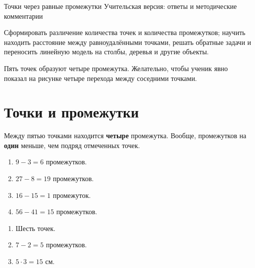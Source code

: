 
\worksheettitle
  {Точки через равные промежутки}
  {Учительская версия: ответы и методические комментарии}

\begin{teacherbox}
  Сформировать различение количества точек и количества промежутков;
  научить находить расстояние между равноудалёнными точками, решать обратные
  задачи и переносить линейную модель на столбы, деревья и другие объекты.
\end{teacherbox}

\begin{checkpointbox}
  Пять точек образуют четыре промежутка. Желательно, чтобы ученик явно
  показал на рисунке четыре перехода между соседними точками.
\end{checkpointbox}

\section{Точки и промежутки}

\pointsvsintervalsfigure

\begin{propertybox}
  Между пятью точками находится \textbf{четыре} промежутка. Вообще,
  промежутков на \textbf{один} меньше, чем подряд отмеченных точек.
\end{propertybox}

\begin{practicebox}
  \begin{enumerate}[label=\alph*),itemsep=0.45em]
    \item \(9-3=6\) промежутков.
    \item \(27-8=19\) промежутков.
    \item \(16-15=1\) промежуток.
    \item \(56-41=15\) промежутков.
  \end{enumerate}
\end{practicebox}

\studentcountstrip

\begin{practicebox}
  \begin{enumerate}[label=\alph*),itemsep=0.45em]
    \item Шесть точек.
    \item \(7-2=5\) промежутков.
    \item \(5\cdot3=15\) см.
  \end{enumerate}
\end{practicebox}


